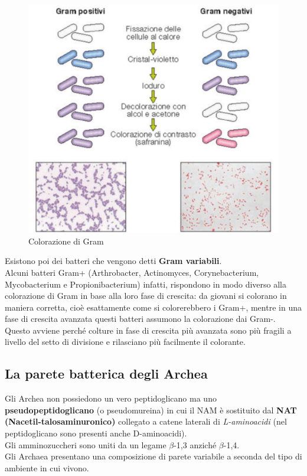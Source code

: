 \documentclass[11pt]{book}
\begin{document}
\clearpage
\begin{figure}[htp]
\centering
\includegraphics[scale=0.5]{img/Colorazione di Gram.png}
\caption{Colorazione di Gram}
\label{}
\end{figure}

Esistono poi dei batteri che vengono detti \textbf{Gram variabili}.\\
Alcuni batteri Gram+ (Arthrobacter, Actinomyces, Corynebacterium, Mycobacterium e Propionibacterium) infatti, rispondono in modo diverso alla colorazione di Gram in base alla loro fase di crescita: da giovani si colorano in maniera corretta, cioè esattamente come si colorerebbero i Gram+, mentre in una fase di crescita avanzata questi batteri assumono la colorazione dai Gram-. Questo avviene perché colture in fase di crescita più avanzata sono più fragili a livello del setto di divisione e rilasciano più facilmente il colorante.


\subsection{La parete batterica degli Archea}
Gli Archea non possiedono un vero peptidoglicano ma uno \textbf{pseudopeptidoglicano} (o pseudomureina) in cui il NAM è sostituito dal \textbf{NAT (Nacetil-talosaminuronico)} collegato a catene laterali di \emph{L-aminoacidi} (nel peptidoglicano sono presenti anche D-aminoacidi).\\
Gli amminozuccheri sono uniti da un legame $\beta$-1,3 anziché $\beta$-1,4.\\
Gli Archaea presentano una composizione di parete variabile a seconda del tipo di ambiente in cui vivono.
\end{document}
